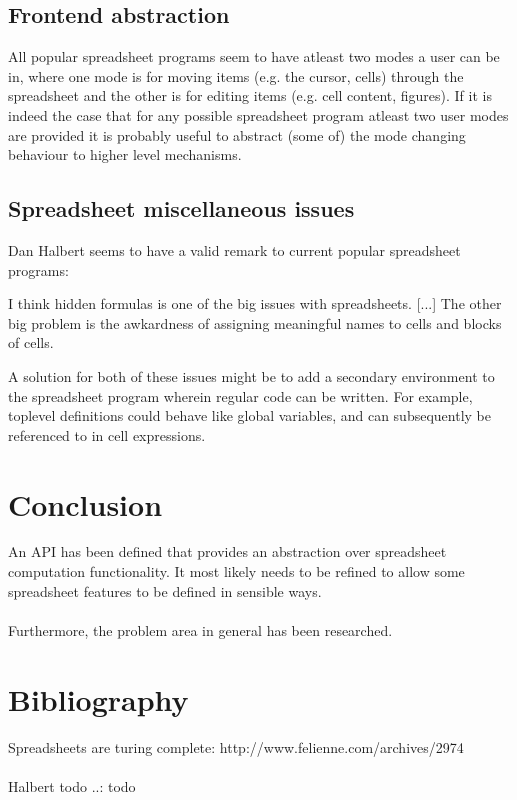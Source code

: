\documentclass[10pt,a4paper]{article}
\begin{document}
\subsection{Frontend abstraction}
\label{Frontend abstraction}
All popular spreadsheet programs seem to have atleast two modes a user can be in,
where one mode is for moving items (e.g. the cursor, cells) through the spreadsheet and the other
is for editing items (e.g. cell content, figures).
If it is indeed the case that for any possible spreadsheet program atleast two user modes are
provided it is probably useful to abstract (some of) the mode changing behaviour to higher level
mechanisms.

\subsection{Spreadsheet miscellaneous issues}
\label{Spreadsheet miscellaneous issues}
Dan Halbert seems to have a valid remark to current popular spreadsheet programs:
\begin{displayquote}
I think hidden formulas is one of the big issues with spreadsheets. [...] The other big problem
is the awkardness of assigning meaningful names to cells and blocks of cells.
\end{displayquote}
A solution for both of these issues might be to add a secondary environment to the spreadsheet program
wherein regular code can be written. For example, toplevel definitions could behave like global
variables, and can subsequently be referenced to in cell expressions.

\section{Conclusion}
An API has been defined that provides an abstraction over spreadsheet computation functionality.
It most likely needs to be refined to allow some spreadsheet features to be defined in
sensible ways.
\\\\
Furthermore, the problem area in general has been researched.

\section*{Bibliography}
Spreadsheets are turing complete: http://www.felienne.com/archives/2974
\\\\
Halbert todo ..: todo
\end{document}
